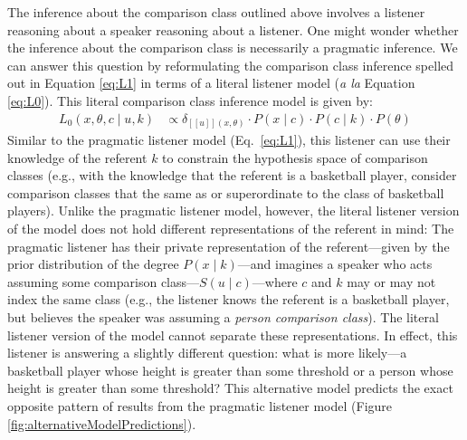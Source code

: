 \documentclass[doc]{apa6}
\begin{document}
The inference about the comparison class outlined above involves a listener reasoning about a speaker reasoning about a listener.
One might wonder whether the inference about the comparison class is necessarily a pragmatic inference.
We can answer this question by reformulating the comparison class inference  spelled out in Equation \ref{eq:L1} in terms of a literal listener model (\emph{a la} Equation \ref{eq:L0}). 
This literal comparison class inference model is given by:
%
  \begin{align}
L_{0}(x, \theta, c \mid u, k) &\propto \delta_{[\![u]\!](x, \theta)} \cdot P(x \mid c) \cdot P(c \mid k) \cdot P(\theta) \label{eq:L0alt}
\end{align}
%
Similar to the pragmatic listener model (Eq.~\ref{eq:L1}), this listener can use their knowledge of the referent $k$ to constrain the hypothesis space of comparison classes (e.g., with the knowledge that the referent is a basketball player, consider comparison classes that the same as or superordinate to the class of basketball players).
Unlike the pragmatic listener model, however, the literal listener version of the model does not hold different representations of the referent in mind: The pragmatic listener has their private representation of the referent---given by the prior distribution of the degree $P(x \mid k)$---and imagines a speaker who acts assuming some comparison class---$S(u \mid c)$---where $c$ and $k$ may or may not index the same class (e.g., the listener knows the referent is a basketball player, but believes the speaker was assuming a \emph{person comparison class}).
The literal listener version of the model cannot separate these representations.
In effect, this listener is answering a slightly different question: what is more likely---a basketball player whose height is greater than some threshold or a person whose height is greater than some threshold? 
This alternative model predicts the exact opposite pattern of results from the pragmatic listener model (Figure \ref{fig:alternativeModelPredictions}). 
\end{document}
